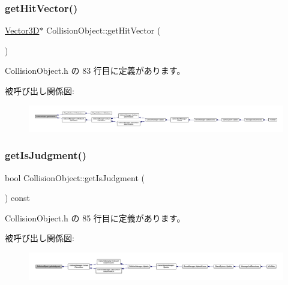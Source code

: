 \subsubsection{\texorpdfstring{get\+Hit\+Vector()}{getHitVector()}}
{\footnotesize\ttfamily \mbox{\hyperlink{class_vector3_d}{Vector3D}}$\ast$ Collision\+Object\+::get\+Hit\+Vector (\begin{DoxyParamCaption}{ }\end{DoxyParamCaption})\hspace{0.3cm}{\ttfamily [inline]}}



 Collision\+Object.\+h の 83 行目に定義があります。

被呼び出し関係図\+:
\nopagebreak
\begin{figure}[H]
\begin{center}
\leavevmode
\includegraphics[width=350pt]{class_collision_object_adb01187ec10302f13034407a3c852860_icgraph}
\end{center}
\end{figure}
\mbox{\label{class_collision_object_ac11b01882a159efadbe62bd5a66c49aa}} 
\subsubsection{\texorpdfstring{get\+Is\+Judgment()}{getIsJudgment()}}
{\footnotesize\ttfamily bool Collision\+Object\+::get\+Is\+Judgment (\begin{DoxyParamCaption}{ }\end{DoxyParamCaption}) const\hspace{0.3cm}{\ttfamily [inline]}}



 Collision\+Object.\+h の 85 行目に定義があります。

被呼び出し関係図\+:
\nopagebreak
\begin{figure}[H]
\begin{center}
\leavevmode
\includegraphics[width=350pt]{class_collision_object_ac11b01882a159efadbe62bd5a66c49aa_icgraph}
\end{center}
\end{figure}
\mbox{\label{class_collision_object_a1198d5941d2ba8a9b394c0e43e4b9fd9}} 
